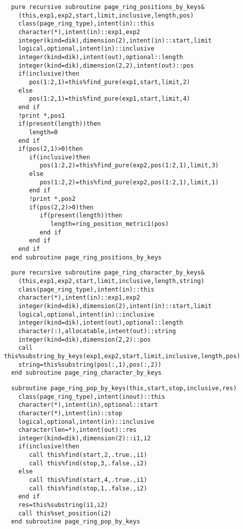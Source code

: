 \begin{Verbatim}
  pure recursive subroutine page_ring_positions_by_keys&
    (this,exp1,exp2,start,limit,inclusive,length,pos)
    class(page_ring_type),intent(in)::this
    character(*),intent(in)::exp1,exp2
    integer(kind=dik),dimension(2),intent(in)::start,limit
    logical,optional,intent(in)::inclusive
    integer(kind=dik),intent(out),optional::length
    integer(kind=dik),dimension(2,2),intent(out)::pos
    if(inclusive)then
       pos(1:2,1)=this%find_pure(exp1,start,limit,2)
    else
       pos(1:2,1)=this%find_pure(exp1,start,limit,4)
    end if
    !print *,pos1
    if(present(length))then
       length=0
    end if
    if(pos(2,1)>0)then
       if(inclusive)then
          pos(1:2,2)=this%find_pure(exp2,pos(1:2,1),limit,3)
       else
          pos(1:2,2)=this%find_pure(exp2,pos(1:2,1),limit,1)
       end if
       !print *,pos2
       if(pos(2,2)>0)then
          if(present(length))then
             length=ring_position_metric1(pos)
          end if
       end if
    end if
  end subroutine page_ring_positions_by_keys
\end{Verbatim}

\begin{Verbatim}
  pure recursive subroutine page_ring_character_by_keys&
    (this,exp1,exp2,start,limit,inclusive,length,string)
    class(page_ring_type),intent(in)::this
    character(*),intent(in)::exp1,exp2
    integer(kind=dik),dimension(2),intent(in)::start,limit
    logical,optional,intent(in)::inclusive
    integer(kind=dik),intent(out),optional::length
    character(:),allocatable,intent(out)::string
    integer(kind=dik),dimension(2,2)::pos
    call this%substring_by_keys(exp1,exp2,start,limit,inclusive,length,pos)
    string=this%substring(pos(:,1),pos(:,2))
  end subroutine page_ring_character_by_keys
\end{Verbatim}

\begin{Verbatim}
  subroutine page_ring_pop_by_keys(this,start,stop,inclusive,res)
    class(page_ring_type),intent(inout)::this
    character(*),intent(in),optional::start
    character(*),intent(in)::stop
    logical,optional,intent(in)::inclusive
    character(len=*),intent(out)::res
    integer(kind=dik),dimension(2)::i1,i2
    if(inclusive)then
       call this%find(start,2,.true.,i1)
       call this%find(stop,3,.false.,i2)
    else
       call this%find(start,4,.true.,i1)
       call this%find(stop,1,.false.,i2)
    end if
    res=this%substring(i1,i2)
    call this%set_position(i2)
  end subroutine page_ring_pop_by_keys
\end{Verbatim}

